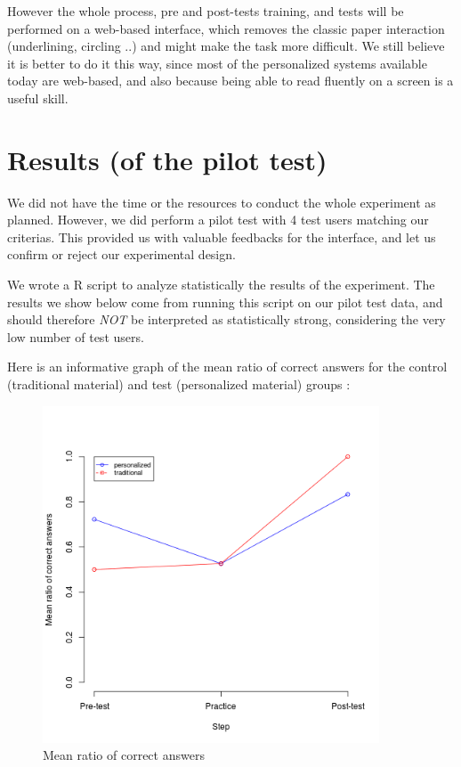 \documentclass[a4paper,12pt]{article}
\begin{document}
However the whole process, pre and post-tests training, and tests will be performed on a web-based interface, which removes the classic paper interaction (underlining, circling ..) and might make the task more difficult. We still believe it is better to do it this way, since most of the personalized systems available today are web-based, and also because being able to read fluently on a screen is a useful skill.


\section{Results (of the pilot test)}

We did not have the time or the resources to conduct the whole experiment as planned. However, we did perform a pilot test with 4 test users matching our criterias. This provided us with valuable feedbacks for the interface, and let us confirm or reject our experimental design.

We wrote a R script to analyze statistically the results of the experiment.
The results we show below come from running this script on our pilot test data, and should therefore \textit{NOT} be interpreted as statistically strong, considering the very low number of test users.

Here is an informative graph of the mean ratio of correct answers for the control (traditional material) and test (personalized material) groups :

\begin{figure}[H]
\begin{center}
\includegraphics[width=10cm]{means.png}
\caption{Mean ratio of correct answers}
\label{means}
\end{center}
\end{figure}
\end{document}
